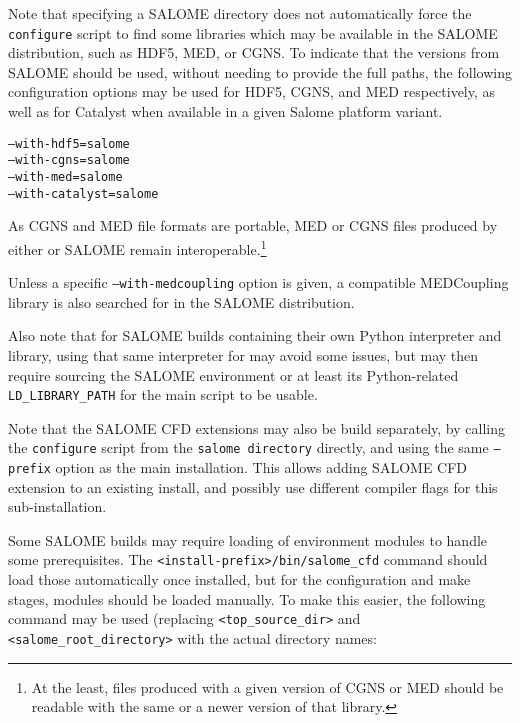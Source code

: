 \documentclass[a4paper,10pt,twoside]{csshortdoc}
\begin{document}
Note that specifying a SALOME directory does not automatically
force the \CS \texttt{configure} script to find some libraries
which may be available in the SALOME distribution, such as HDF5,
MED, or CGNS. To indicate that the versions from SALOME should be used,
without needing to provide the full paths, the following configuration
options may be used for HDF5, CGNS, and MED respectively, as well
as for Catalyst when available in a given Salome platform variant.

 \texttt{--with-hdf5=salome}\\
 \texttt{--with-cgns=salome}\\
 \texttt{--with-med=salome}\\
 \texttt{--with-catalyst=salome}

As CGNS and MED file formats are portable, MED or CGNS files produced
by either \CS or SALOME remain interoperable.\footnote{At the least,
files produced with a given version of CGNS or MED should be readable
with the same or a newer version of that library.}

Unless a specific \texttt{--with-medcoupling} option is given, a compatible
MEDCoupling library is also searched for in the SALOME distribution.

Also note that for SALOME builds containing their own Python interpreter and library,
using that same interpreter for \CS may avoid some issues, but may then require
sourcing the SALOME environment or at least its Python-related
\texttt{LD\_LIBRARY\_PATH} for the main \CS script to be usable.

Note that the SALOME CFD extensions may also be build separately, by calling
the \texttt{configure} script from the \texttt{salome directory} directly,
and using the same \texttt{--prefix} option as the main \CS installation.
This allows adding SALOME CFD extension to an existing install,
and possibly use different compiler flags for this sub-installation.

Some SALOME builds may require loading of environment modules to handle
some prerequisites.
The \texttt{<install-prefix>/bin/salome\_cfd} command should load those
automatically once installed, but for the configuration and make
stages, modules should be loaded manually. To make this easier,
the following command may be used (replacing \texttt{<top\_source\_dir>}
and \texttt{<salome\_root\_directory>} with the actual directory names:

\end{document}
